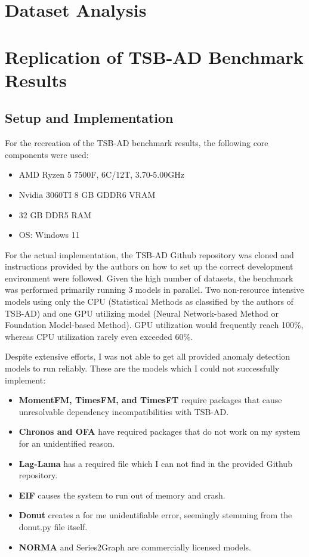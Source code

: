 \documentclass[12pt,oneside]{article}
\begin{document}
\section{Dataset Analysis}

\section{Replication of TSB-AD Benchmark Results}

\subsection{Setup and Implementation}
For the recreation of the TSB-AD benchmark results, the following core components were used:
\begin{itemize}
    \item AMD Ryzen 5 7500F, 6C/12T, 3.70-5.00GHz
    \item Nvidia 3060TI 8 GB GDDR6 VRAM
    \item 32 GB DDR5 RAM
    \item OS: Windows 11
\end{itemize}

For the actual implementation, the TSB-AD Github repository was cloned and instructions provided by the authors on how to set up the correct development environment were followed. Given the high number of datasets, the benchmark was performed primarily running 3 models in parallel. Two non-resource intensive models using only the CPU (Statistical Methods as classified by the authors of TSB-AD) and one GPU utilizing model (Neural Network-based Method or Foundation Model-based Method). GPU utilization would frequently reach 100\%, whereas CPU utilization rarely even exceeded 60\%.\par
Despite extensive efforts, I was not able to get all provided anomaly detection models to run reliably. These are the models which I could not successfully implement:

\begin{itemize}
    \item \textbf{MomentFM, TimesFM, and TimesFT} require packages that cause unresolvable dependency incompatibilities with TSB-AD.
    \item \textbf{Chronos and OFA} have required packages that do not work on my system for an unidentified reason. 
    \item \textbf{Lag-Lama} has a required file which I can not find in the provided Github repository.
    \item \textbf{EIF} causes the system to run out of memory and crash.
    \item \textbf{Donut} creates a for me unidentifiable error, seemingly stemming from the donut.py file itself.
    \item \textbf{NORMA} and Series2Graph are commercially licensed models. 
\end{itemize}
\end{document}

